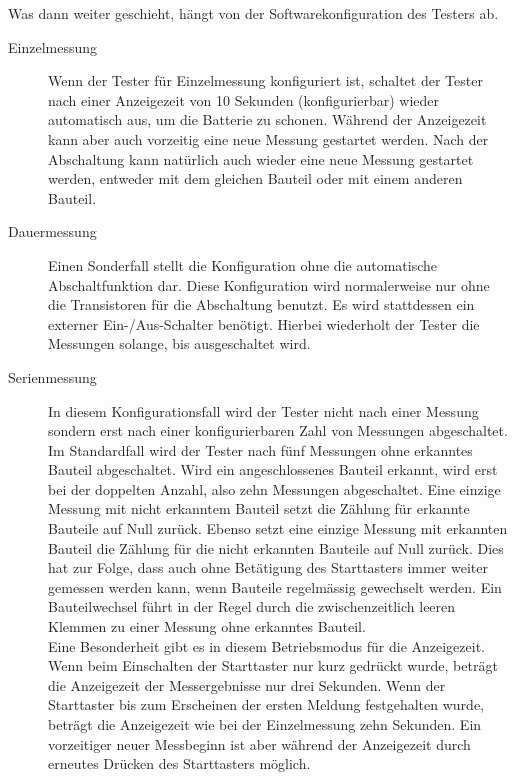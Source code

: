 Was dann weiter geschieht, hängt von der Softwarekonfiguration des Testers ab.
\begin{description}
  \item[Einzelmessung] Wenn der Tester für Einzelmessung konfiguriert ist, schaltet der Tester nach einer Anzeigezeit von 10 Sekunden
(konfigurierbar) wieder automatisch aus, um die Batterie zu schonen. Während der Anzeigezeit kann aber
auch vorzeitig eine neue Messung gestartet werden. Nach der Abschaltung kann natürlich auch wieder eine
neue Messung gestartet werden, entweder mit dem gleichen Bauteil oder mit einem anderen Bauteil.\\

  \item[Dauermessung] Einen Sonderfall stellt die Konfiguration ohne die automatische Abschaltfunktion dar.
Diese Konfiguration wird normalerweise nur ohne die Transistoren für die Abschaltung benutzt.
Es wird stattdessen ein externer Ein-/Aus-Schalter benötigt. Hierbei wiederholt der Tester die
Messungen solange, bis ausgeschaltet wird.\\

  \item[Serienmessung] In diesem Konfigurationsfall wird der Tester nicht nach einer Messung sondern erst nach einer konfigurierbaren
Zahl von Messungen abgeschaltet. Im Standardfall wird der Tester nach fünf Messungen ohne erkanntes Bauteil
abgeschaltet. Wird ein angeschlossenes Bauteil erkannt, wird erst bei der doppelten Anzahl, also zehn Messungen abgeschaltet.
Eine einzige Messung mit nicht erkanntem Bauteil setzt die Zählung für erkannte Bauteile auf Null zurück.
Ebenso setzt eine einzige Messung mit erkannten Bauteil die Zählung für die nicht erkannten Bauteile auf Null zurück.
Dies hat zur Folge, dass auch ohne Betätigung des Starttasters immer weiter gemessen werden kann,
 wenn Bauteile regelmässig gewechselt werden.
Ein Bauteilwechsel führt in der Regel durch die zwischenzeitlich leeren Klemmen zu einer Messung ohne erkanntes Bauteil.\\

Eine Besonderheit gibt es in diesem Betriebsmodus für die Anzeigezeit. Wenn beim Einschalten der Starttaster nur kurz
gedrückt wurde, beträgt die Anzeigezeit der Messergebnisse nur drei Sekunden. Wenn der Starttaster bis zum Erscheinen der
ersten Meldung festgehalten wurde, beträgt die Anzeigezeit wie bei der Einzelmessung zehn Sekunden.
Ein vorzeitiger neuer Messbeginn ist aber während der Anzeigezeit durch erneutes Drücken des Starttasters möglich.\\

\end{description}

